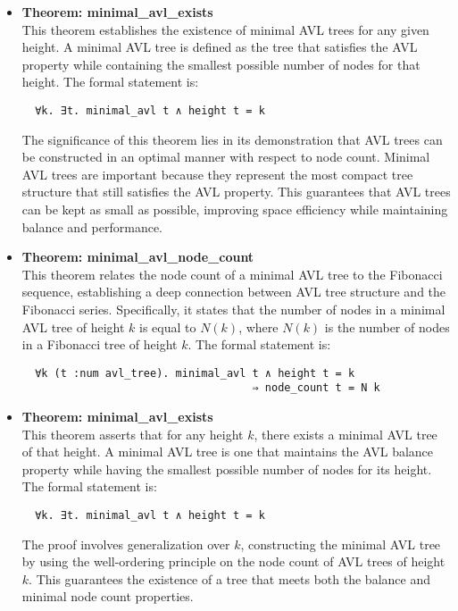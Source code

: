 \documentclass[12pt]{article}
\begin{document}
\begin{itemize}
  \item \textbf{Theorem: minimal\_avl\_exists} \\
  This theorem establishes the existence of minimal AVL trees for any given height. A minimal AVL tree is defined as the tree that satisfies the AVL property while containing the smallest possible number of nodes for that height. The formal statement is:
  \begin{verbatim}
  ∀k. ∃t. minimal_avl t ∧ height t = k
  \end{verbatim}
  The significance of this theorem lies in its demonstration that AVL trees can be constructed in an optimal manner with respect to node count. Minimal AVL trees are important because they represent the most compact tree structure that still satisfies the AVL property. This guarantees that AVL trees can be kept as small as possible, improving space efficiency while maintaining balance and performance.

  \item \textbf{Theorem: minimal\_avl\_node\_count} \\
  This theorem relates the node count of a minimal AVL tree to the Fibonacci sequence, establishing a deep connection between AVL tree structure and the Fibonacci series. Specifically, it states that the number of nodes in a minimal AVL tree of height \( k \) is equal to \( N(k) \), where \( N(k) \) is the number of nodes in a Fibonacci tree of height \( k \). The formal statement is:
  \begin{verbatim}
  ∀k (t :num avl_tree). minimal_avl t ∧ height t = k
                                    ⇒ node_count t = N k
  \end{verbatim}

  \item \textbf{Theorem: minimal\_avl\_exists} \\
  This theorem asserts that for any height \( k \), there exists a minimal AVL tree of that height. A minimal AVL tree is one that maintains the AVL balance property while having the smallest possible number of nodes for its height. The formal statement is:
  \begin{verbatim}
  ∀k. ∃t. minimal_avl t ∧ height t = k
  \end{verbatim}
  The proof involves generalization over \( k \), constructing the minimal AVL tree by using the well-ordering principle on the node count of AVL trees of height \( k \). This guarantees the existence of a tree that meets both the balance and minimal node count properties.


\end{itemize}
\end{document}
